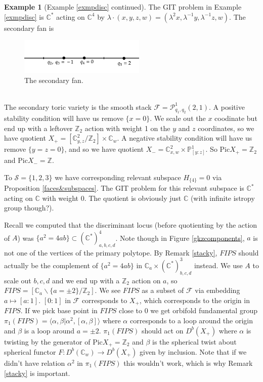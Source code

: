 \documentclass[oneside]{amsart}
\theoremstyle{definition}
\theoremstyle{definition}
\theoremstyle{definition}
\newtheorem{example}{Example} [section]
\theoremstyle{definition}
\newcommand{\CC}{\mathbb{C}}
\newcommand{\PP}{\mathbb{P}}
\newcommand{\Z}{\mathbb{Z}}
\newcommand{\Fs}{\mathcal{F}}
\begin{document}
\begin{example}[Example \ref{exmpdisc} continued]
    The GIT problem in Example \ref{exmpdisc} is $\CC^*$ acting on $\CC^4$ by $\lambda \cdot (x,y,z,w) = (\lambda^2x , \lambda^{-1}y, \lambda^{-1}z,w) $. The secondary fan is
    \begin{figure}[!h]
        \centering
        \includegraphics[width=6cm]{face&subspace/secondary.png}
        \caption{The secondary fan.}
    \end{figure}\\
    The secondary toric variety is the smooth stack $\Fs = \mathcal{P}^1_{q_1,q_2}(2,1)$. A positive stability condition will have us remove $\{ x=0\}$. We scale out the $x$ coodinate but end up with a leftover $\Z_2$ action with weight 1 on the $y$ and $z$ coordinates, so we have quotient $X_+ = [\CC^2_{y,z}/ \Z_2] \times \CC_w$. A negative stability condition will have us remove $\{ y=z=0\}$, and so we have quotient $X_- = \CC^2_{x,w} \times \PP^1_{[y:z]}$. So $\text{Pic} X_+ = \Z_2$ and $\text{Pic} X_- = \Z$.  \par
    To $\mathcal{S} = \{ 1,2,3\}$ we have corresponding relevant subspace $H_{\{4\}} =0$ via Proposition \ref{faces&subspaces}. The GIT problem for this relevant subspace is $\CC^*$ acting on $\CC$ with weight 0. The quotient is obviously just $\CC$ (with infinite istropy group though?). \par
    Recall we computed that the discriminant locus (before quotienting by the action of $A$) was $\{a^2 = 4ab \} \subset (\CC^*)^{4}_{a,b,c,d}$. Note though in Figure \ref{gkzcomponents}, $a$ is not one of the vertices of the primary polytope. By Remark \ref{stacky}, $FIPS$ should actually be the complement of $\{a^2 = 4ab \}$ in $\CC_a \times (\CC^*)^3_{b,c,d}$ instead. We use $A$ to scale out $b,c,d$ and  we end up with a $\Z_2$ action on $a$, so $FIPS = [\CC_a \backslash \{a = \pm 2 \} / \Z_2 ]$. We see $FIPS$ as a subset of $\Fs$ via embedding $a \mapsto [a:1]$. $[0:1]$ in $\Fs$ corresponds to $X_+$, which corresponds to the origin in $FIPS$. If we pick base point in $FIPS$ close to 0 we get orbifold fundamental group $ \pi_1(FIPS) = \langle \alpha, \beta | \alpha^2, [\alpha,\beta] \rangle$ where $\alpha$ corresponds to a loop around the origin and $\beta$ is a loop around $a = \pm 2$. $\pi_1(FIPS)$ should act on $D^b(X_+)$ where $\alpha$ is twisting by the generator of $\text{Pic} X_+ = \Z_2$ and $\beta$ is the spherical twist about spherical functor $F : D^b(\CC_w) \to D^b(X_+)$ given by inclusion. Note that if we didn't have relation $\alpha^2$ in $\pi_1(FIPS)$ this wouldn't work, which is why Remark \ref{stacky} is important.
\end{example}
\end{document}
